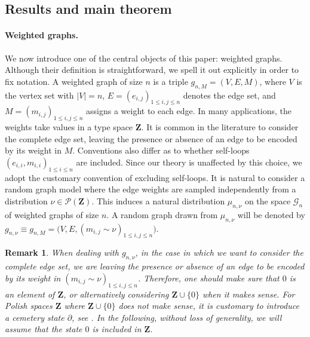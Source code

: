 \documentclass[12pt,twoside,a4paper]{article}
\newtheorem{remark}[theorem]{Remark}
\newcommand{\Space}{\mathbf{Z}}
\begin{document}
\subsection{Results and main theorem}
\paragraph{Weighted graphs.} We now introduce one of the central objects of this paper: weighted graphs. Although their definition is straightforward, we spell it out explicitly in order to fix notation.  
A weighted graph of size $n$ is a triple $g_{n,M} = (V,E,M)$, where $V$ is the vertex set with $|V|=n$, $E = (e_{i,j})_{1 \leq i,j \leq n}$ denotes the edge set, and $M = (m_{i,j})_{1 \leq i,j \leq n}$ assigns a weight to each edge. In many applications, the weights take values in a type space $\Space$. It is common in the literature to consider the complete edge set, leaving the presence or absence of an edge to be encoded by its weight in $M$. Conventions also differ as to whether self-loops $(e_{i,i},m_{i,i})_{1 \leq i \leq n}$ are included. Since our theory is unaffected by this choice, we adopt the customary convention of excluding self-loops.  
It is natural to consider a random graph model where the edge weights are sampled independently from a distribution $\nu \in \mathcal{P}(\Space)$. This induces a natural distribution $\mu_{n,\nu}$ on the space $\mathcal{G}_n$ of weighted graphs of size $n$. A random graph drawn from $\mu_{n,\nu}$ will be denoted by $g_{n,\nu} \equiv g_{n,M} = \bigl(V,E,(m_{i,j} \sim \nu)_{1 \leq i,j \leq n}\bigr)$.
\begin{remark}\label{rmk:Zero}
When dealing with $g_{n,\nu}$, in the case in which we want to consider the complete edge set, we are leaving the presence or absence of an edge to be encoded by its weight in $(m_{i,j}\sim \nu)_{1 \leq i,j \leq n}$. Therefore, one should make sure that $0$ is an element of $\Space$, or alternatively considering $\Space\cup\{0\}$ when it makes sense. For Polish spaces $\Space$ where $\Space\cup\{0\}$ does not make sense, it is customary to introduce a cemetery state $\partial$, see \cite[Remark 6.2]{abraham2023probabilitygraphons}. In the following, without loss of generality, we will assume that the state $0$ is included in $\Space$.
\end{remark}
\end{document}
